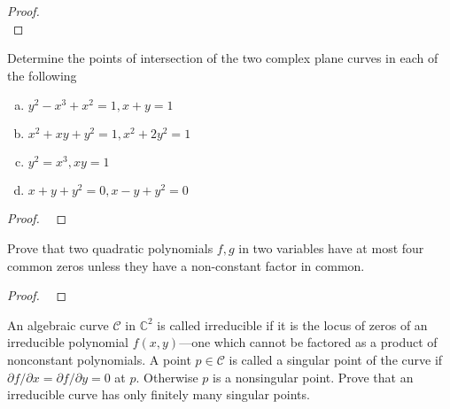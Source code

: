 \documentclass{article}
\newenvironment{problem}[2][Problem]{\begin{trivlist}
\item[\hskip \labelsep {\bfseries #1}\hskip \labelsep {\bfseries #2.}]}{\end{trivlist}}
\begin{document}
\begin{proof} ~ \\
\end{proof}
\pagebreak
\begin{problem}{8 (Artin)}
  Determine the points of intersection of the two complex plane curves in each
  of the following \begin{enumerate}[(a)]
    \item $y^2 - x^3 + x^2 = 1, x + y = 1$
    \item $x^2 + xy + y^2 = 1, x^2 + 2y^2 = 1$
    \item $y^2 = x^3, xy = 1$
    \item $x + y + y^2 = 0, x - y + y^2 = 0$
  \end{enumerate}
\end{problem}

\begin{proof} ~
\end{proof}
\pagebreak
\begin{problem}{9 (Artin)}
  Prove that two quadratic polynomials $f, g$ in two variables have at most four
  common zeros unless they have a non-constant factor in common.
\end{problem}

\begin{proof} ~
\end{proof}
\pagebreak
\begin{problem}{10 (Artin)}
  An algebraic curve $\mathcal C$ in $\mathbb C^2$ is called irreducible if it
  is the locus of zeros of an irreducible polynomial $f(x, y)$---one which
  cannot be factored as a product of nonconstant polynomials. A point
  $p \in \mathcal C$ is called a singular point of the curve if
  $\partial f/\partial x = \partial f/\partial y = 0$ at $p$. Otherwise $p$ is
  a nonsingular point. Prove that an irreducible curve has only finitely many
  singular points.
\end{problem}
\end{document}
